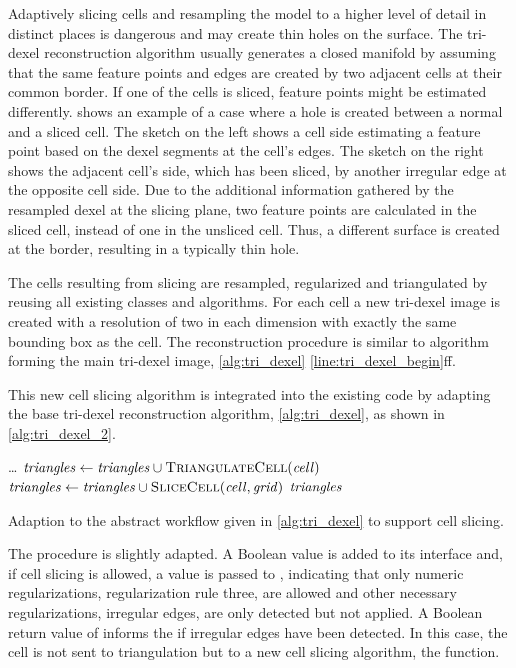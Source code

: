 Adaptively slicing cells and resampling the model to a higher level of detail in distinct places is dangerous and may create thin holes on the surface.
The tri-dexel reconstruction algorithm usually generates a closed manifold by assuming that the same feature points and edges are created by two adjacent cells at their common border.
If one of the cells is sliced, feature points might be estimated differently.
 shows an example of a case where a hole is created between a normal and a sliced cell.
The sketch on the left shows a cell side estimating a feature point based on the dexel segments at the cell's edges.
The sketch on the right shows the adjacent cell's side, which has been sliced, \eg by another irregular edge at the opposite cell side.
Due to the additional information gathered by the resampled dexel at the slicing plane, two feature points are calculated in the sliced cell, instead of one in the unsliced cell.
Thus, a different surface is created at the border, resulting in a typically thin hole.

The cells resulting from slicing are resampled, regularized and triangulated by reusing all existing classes and algorithms.
For each cell a new tri-dexel image is created with a resolution of two in each dimension with exactly the same bounding box as the cell.
The reconstruction procedure is similar to algorithm forming the main tri-dexel image, \cf \cref{alg:tri_dexel} \cref{line:tri_dexel_begin}ff.

This new cell slicing algorithm is integrated into the existing code by adapting the base tri-dexel reconstruction algorithm, \cref{alg:tri_dexel}, as shown in \cref{alg:tri_dexel_2}.
%
\begin{algorithm}
	\centering
	\begin{algorithmic}[1]
		\hfill\break
			\hspace*{\dimexpr\algorithmicindent*1}\dots
					\State $\var{triangles} \gets \var{triangles} \cup \Call{TriangulateCell}{\var{cell}}$
				\Else
					\State $\var{triangles} \gets \var{triangles} \cup \Call{SliceCell}{\var{cell}, \var{grid}}$
				\EndIf
			\EndFor
			\State \Return $\mathit{triangles}$
		\EndFunction
	\end{algorithmic}
	\caption{
		Adaption to the abstract workflow given in \cref{alg:tri_dexel} to support cell slicing.
	}
	\label{alg:tri_dexel_2}
\end{algorithm}
%
The  procedure is slightly adapted.
A Boolean value is added to its interface and, if cell slicing is allowed, a value \True is passed to , indicating that only numeric regularizations, \cf regularization rule three, are allowed and other necessary regularizations, \ie irregular edges, are only detected but not applied.
A Boolean return value of  informs the if irregular edges have been detected.
In this case, the cell is not sent to triangulation but to a new cell slicing algorithm, the  function.

